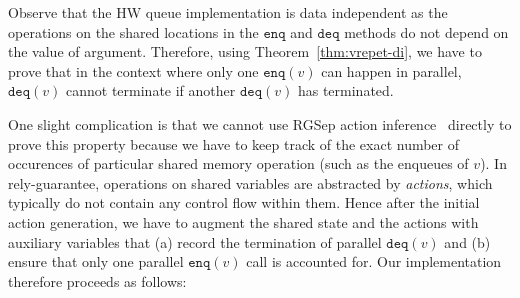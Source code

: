 \documentclass{LMCS}
\newcommand{\enq}{\ensuremath{\mathtt{enq}}}
\newcommand{\deq}{\ensuremath{\mathtt{deq}}}
\begin{document}
Observe that the HW queue implementation is data independent as the operations 
on the shared locations in the $\enq$ and $\deq$ methods do not depend
on the value of argument. 
Therefore, using Theorem~\ref{thm:vrepet-di}, we have to prove that in the
context where only one $\enq(v)$ can happen in parallel, $\deq(v)$ cannot
terminate if another $\deq(v)$ has terminated.

One slight complication is that we cannot use RGSep action
inference~\cite{Vaf2010} directly to prove this property because we have to
keep track of the exact number of occurences of particular shared memory
operation (such as the enqueues of $v$).
In rely-guarantee, operations on shared variables are abstracted by 
\emph{actions}, which typically do not contain any control flow within them. 
Hence after the initial action generation, 
we have to augment the shared state and the actions with 
auxiliary variables that 
(a) record the termination of parallel $\deq(v)$ and 
(b) ensure that only one parallel $\enq(v)$ call is accounted for.
Our implementation therefore proceeds as follows:
\end{document}

